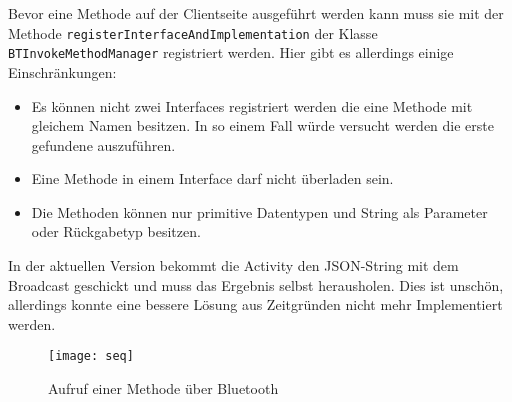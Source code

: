 \begin{sloppypar}
Bevor eine Methode auf der Clientseite ausgeführt werden kann muss sie mit der Methode \lstinline{registerInterfaceAndImplementation} der Klasse \lstinline{BTInvokeMethodManager} registriert werden. Hier gibt es allerdings einige Einschränkungen:
\end{sloppypar}
\begin{itemize}
  \item Es können nicht zwei Interfaces registriert werden die eine Methode mit gleichem Namen besitzen. In so einem Fall würde versucht werden die erste gefundene auszuführen.
  \item Eine Methode in einem Interface darf nicht überladen sein.
  \item Die Methoden können nur primitive Datentypen und String als Parameter oder Rückgabetyp besitzen.
\end{itemize}
In der aktuellen Version bekommt die Activity den JSON-String mit dem Broadcast geschickt und muss das Ergebnis selbst herausholen. Dies ist unschön, allerdings konnte eine bessere Lösung aus Zeitgründen nicht mehr Implementiert werden. 
\begin{figure}[htbp]
  \centering
  \texttt{[image: seq]}
  \caption{Aufruf einer Methode über Bluetooth}
  \label{fig:seq}
\end{figure}

